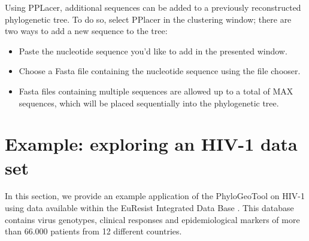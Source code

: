 \documentclass[a4paper, 11pt]{article} %
\begin{document}
Using PPLacer, additional sequences can be added to a previously reconstructed phylogenetic tree.
To do so, select PPlacer in the clustering window; there are two ways to add a new sequence to the tree:
\begin{itemize}
\item Paste the nucleotide sequence you'd like to add in the presented window.
\item Choose a Fasta file containing the nucleotide sequence using the file chooser.
\item Fasta files containing multiple sequences are allowed up to a total of MAX sequences, which will be placed sequentially into the phylogenetic tree.
\end{itemize}



\section{Example: exploring an HIV-1 data set}

In this section, we provide an example application of the PhyloGeoTool on HIV-1 using data available within the EuResist Integrated Data Base \citep{Zazzi2012}. 
This database contains virus genotypes, clinical responses and epidemiological markers of more than 66.000 patients from 12 different countries.

\end{document}
